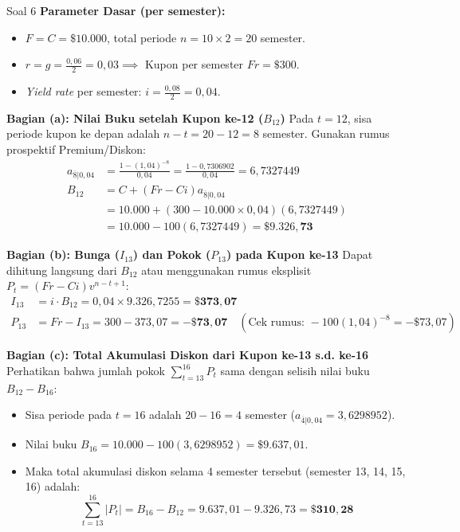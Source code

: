 \documentclass[11pt,a4paper]{article}
\begin{document}
\begin{solutionbox}{Soal 6}
\textbf{Parameter Dasar (per semester):}
\begin{itemize}[itemsep=1pt]
    \item $F = C = \$10.000$, total periode $n = 10 \times 2 = 20$ semester.
    \item $r = g = \frac{0{,}06}{2} = 0{,}03 \implies$ Kupon per semester $Fr = \$300$.
    \item \textit{Yield rate} per semester: $i = \frac{0{,}08}{2} = 0{,}04$.
\end{itemize}

\textbf{Bagian (a): Nilai Buku setelah Kupon ke-12 ($B_{12}$)}
Pada $t = 12$, sisa periode kupon ke depan adalah $n - t = 20 - 12 = 8$ semester. Gunakan rumus prospektif Premium/Diskon:
\begin{align*}
    a_{\overline{8}|0{,}04} &= \frac{1 - (1{,}04)^{-8}}{0{,}04} = \frac{1 - 0{,}7306902}{0{,}04} = 6{,}7327449 \\[0.3em]
    B_{12} &= C + (Fr - Ci) a_{\overline{8}|0{,}04} \\
           &= 10.000 + (300 - 10.000 \times 0{,}04)(6{,}7327449) \\
           &= 10.000 - 100(6{,}7327449) = \mathbf{\$9.326{,}73}
\end{align*}

\textbf{Bagian (b): Bunga ($I_{13}$) dan Pokok ($P_{13}$) pada Kupon ke-13}
Dapat dihitung langsung dari $B_{12}$ atau menggunakan rumus eksplisit $P_t = (Fr - Ci)v^{n-t+1}$:
\begin{align*}
    I_{13} &= i \cdot B_{12} = 0{,}04 \times 9.326{,}7255 = \mathbf{\$373{,}07} \\[0.2em]
    P_{13} &= Fr - I_{13} = 300 - 373{,}07 = \mathbf{-\$73{,}07} \quad (\text{Cek rumus: } -100(1{,}04)^{-8} = -\$73{,}07)
\end{align*}

\textbf{Bagian (c): Total Akumulasi Diskon dari Kupon ke-13 s.d. ke-16}
Perhatikan bahwa jumlah pokok $\sum_{t=13}^{16} P_t$ sama dengan selisih nilai buku $B_{12} - B_{16}$:
\begin{itemize}
    \item Sisa periode pada $t = 16$ adalah $20 - 16 = 4$ semester ($a_{\overline{4}|0{,}04} = 3{,}6298952$).
    \item Nilai buku $B_{16} = 10.000 - 100(3{,}6298952) = \$9.637{,}01$.
    \item Maka total akumulasi diskon selama 4 semester tersebut (semester 13, 14, 15, 16) adalah:
    \begin{equation*}
        \sum_{t=13}^{16} |P_t| = B_{16} - B_{12} = 9.637{,}01 - 9.326{,}73 = \mathbf{\$310{,}28}
    \end{equation*}
\end{itemize}
\end{solutionbox}
\end{document}
